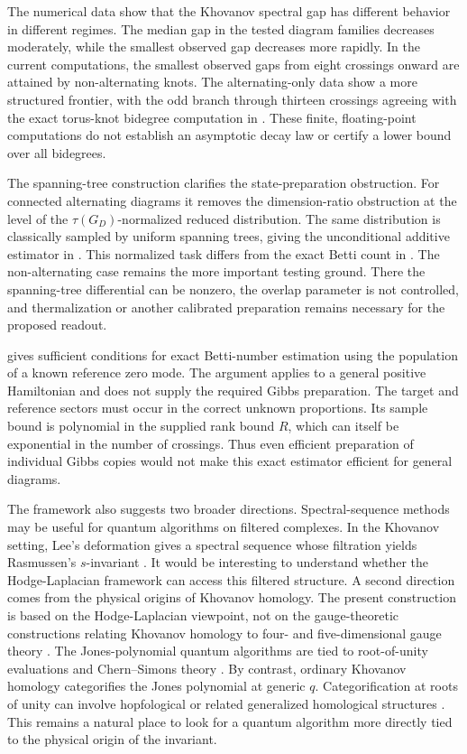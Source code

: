 \documentclass[a4paper,onecolumn,unpublished]{quantumarticle}
\theoremstyle{plain}
\theoremstyle{definition}
\theoremstyle{definition}
\numberwithin{equation}{section}
\begin{document}
The numerical data show that the Khovanov spectral gap has different behavior in different regimes.  The median gap in the tested diagram families decreases moderately, while the smallest observed gap decreases more rapidly.   In the current computations, the smallest observed gaps from eight crossings onward are attained by non-alternating knots.  The alternating-only data show a more structured frontier, with the odd branch through thirteen crossings agreeing with the exact torus-knot bidegree computation in \cite{GrljLaudaSpectralGeometry}. These finite, floating-point computations do not establish an asymptotic decay law or certify a lower bound over all bidegrees. 

The spanning-tree construction clarifies the state-preparation obstruction.  For connected alternating diagrams it removes the dimension-ratio obstruction at the level of the \(\tau(G_D)\)-normalized reduced distribution.  The same distribution is classically sampled by uniform spanning trees, giving the unconditional additive estimator in . This normalized task differs from the exact Betti count in .  The non-alternating case remains the more important testing ground.  There the spanning-tree differential can be nonzero, the overlap parameter is not controlled, and thermalization or another calibrated preparation remains necessary for the proposed readout.

 gives sufficient conditions for exact Betti-number estimation using the population of a known reference zero mode. The argument applies to a general positive Hamiltonian and does not supply the required Gibbs preparation. The target and reference sectors must occur in the correct unknown proportions. Its sample bound is polynomial in the supplied rank bound $R$, which can itself be exponential in the number of crossings. Thus even efficient preparation of individual Gibbs copies would not make this exact estimator efficient for general diagrams.

The framework also suggests two broader directions.  Spectral-sequence methods may be useful for quantum algorithms on filtered complexes.  In the Khovanov setting, Lee's deformation gives a spectral sequence whose filtration yields Rasmussen's \(s\)-invariant \cite{Lee,Rasmussen}.  It would be interesting to understand whether the Hodge-Laplacian framework can access this filtered structure.  A second direction comes from the physical origins of Khovanov homology.  The present construction is based on the Hodge-Laplacian viewpoint, not on the gauge-theoretic constructions relating Khovanov homology to four- and five-dimensional gauge theory \cite{Witten-fivebrane,Gaiotto-Witten,Gukov_2005}.  The Jones-polynomial quantum algorithms are tied to root-of-unity evaluations and Chern--Simons theory \cite{freedman2002simulation,Witten-Jones}.  By contrast, ordinary Khovanov homology categorifies the Jones polynomial at generic \(q\).  Categorification at roots of unity can involve hopfological or related generalized homological structures \cite{khovanov2006hopfological,Qi_2022}.  This remains a natural place to look for a quantum algorithm more directly tied to the physical origin of the invariant.
\end{document}

